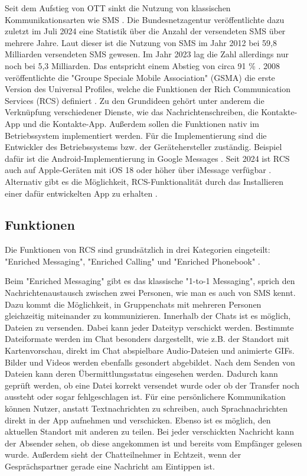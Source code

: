 \documentclass[conference]{IEEEtran}
\begin{document}
Seit dem Aufstieg von OTT sinkt die Nutzung von klassischen Kommunikationsarten wie SMS \cite{ottmobinter}.
Die Bundesnetzagentur veröffentlichte dazu zuletzt im Juli 2024 eine Statistik über die Anzahl der versendeten SMS über mehrere Jahre.
Laut dieser ist die Nutzung von SMS im Jahr 2012 bei 59,8 Milliarden versendeten SMS gewesen.
Im Jahr 2023 lag die Zahl allerdings nur noch bei 5,3 Milliarden.
Das entspricht einem Abstieg von circa 91 \% \cite{smsstats}.
2008 veröffentlichte die "Groupe Speciale Mobile Association" (GSMA) die erste Version des Universal Profiles, welche die Funktionen der Rich Communication Services (RCS) definiert \cite{rcsuite}.
Zu den Grundideen gehört unter anderem die Verknüpfung verschiedener Dienste, wie das Nachrichtenschreiben, die Kontakte-App und die Kontakte-App.
Außerdem sollen die Funktionen nativ im Betriebssystem implementiert werden.
Für die Implementierung sind die Entwickler des Betriebssystems bzw. der Gerätehersteller zuständig.
Beispiel dafür ist die Android-Implementierung in Google Messages \cite{googlemessages}.
Seit 2024 ist RCS auch auf Apple-Geräten mit iOS 18 oder höher über iMessage verfügbar \cite{applemessages}.
Alternativ gibt es die Möglichkeit, RCS-Funktionalität durch das Installieren einer dafür entwickelten App zu erhalten \cite{uniprof}.

\subsection{Funktionen}

Die Funktionen von RCS sind grundsätzlich in drei Kategorien eingeteilt: "Enriched Messaging", "Enriched Calling" und "Enriched Phonebook" \cite{rcsuite,uniprof}.

Beim "Enriched Messaging" gibt es das klassische "1-to-1 Messaging", sprich den Nachrichtenaustausch zwischen zwei Personen, wie man es auch von SMS kennt.
Dazu kommt die Möglichkeit, in Gruppenchats mit mehreren Personen gleichzeitig miteinander zu kommunizieren.
Innerhalb der Chats ist es möglich, Dateien zu versenden.
Dabei kann jeder Dateityp verschickt werden. Bestimmte Dateiformate werden im Chat besonders dargestellt, wie z.B. der Standort mit Kartenvorschau, direkt im Chat abspielbare Audio-Dateien und animierte GIFs.
Bilder und Videos werden ebenfalls gesondert abgebildet.
Nach dem Senden von Dateien kann deren Übermittlungsstatus eingesehen werden.
Dadurch kann geprüft werden, ob eine Datei korrekt versendet wurde oder ob der Transfer noch aussteht oder sogar fehlgeschlagen ist.
Für eine persönlichere Kommunikation können Nutzer, anstatt Textnachrichten zu schreiben, auch Sprachnachrichten direkt in der App aufnehmen und verschicken.
Ebenso ist es möglich, den aktuellen Standort mit anderen zu teilen.
Bei jeder verschickten Nachricht kann der Absender sehen, ob diese angekommen ist und bereits vom Empfänger gelesen wurde.
Außerdem sieht der Chatteilnehmer in Echtzeit, wenn der Gesprächspartner gerade eine Nachricht am Eintippen ist.
\end{document}
